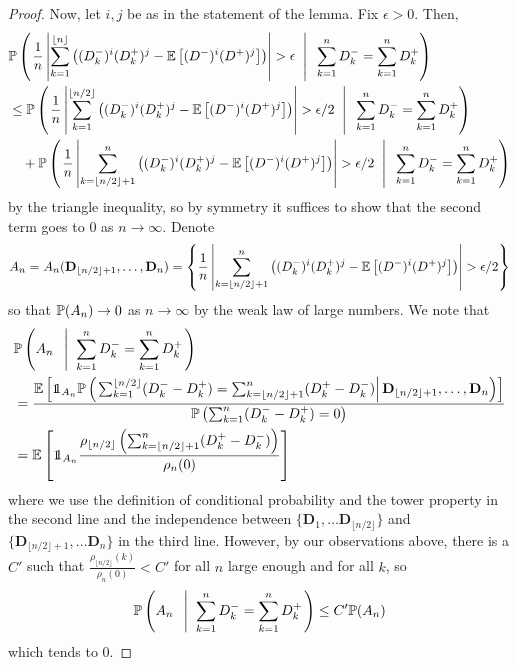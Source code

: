 \begin{proof}
Now, let $i,j$ be as in the statement of the lemma. Fix $\epsilon>0$.  Then,
\begin{align*} 
&\P\left(\left. \frac{1}{n}\left|\sum_{k=1}^{\lfloor n \rfloor}\left((D_k^-)^i(D_k^+)^j- \E\left[ (D^-)^i(D^+)^j \right]\right)\right|>\epsilon\;\; \right|\;\; \sum_{k=1}^n D_k^-=\sum_{k=1}^n D_k^+ \right)\\
&\leq \P\left(\left. \frac{1}{n}\left|\sum_{k=1}^{\lfloor n/2\rfloor}\left((D_k^-)^i(D_k^+)^j- \E\left[ (D^-)^i(D^+)^j \right]\right)\right|>\epsilon/2\;\; \right|\;\; \sum_{k=1}^n D_k^-=\sum_{k=1}^n D_k^+ \right)\\
&\quad +  \P\left(\left. \frac{1}{n}\left|\sum_{k={\lfloor n/2\rfloor}+1}^{n}\left((D_k^-)^i(D_k^+)^j- \E\left[ (D^-)^i(D^+)^j \right]\right)\right|>\epsilon/2\;\; \right|\;\; \sum_{k=1}^n D_k^-=\sum_{k=1}^n D_k^+ \right)
\end{align*}
by the triangle inequality, so by symmetry it suffices to show that the second term goes to $0$ as $n\to \infty$. Denote $$A_n=A_n(\mathbf{D}_{\lfloor n/2\rfloor +1 },\dots,\mathbf{D}_n)=\left\{\frac{1}{n}\left|\sum_{k={\lfloor n/2\rfloor}+1}^{n}\left((D_k^-)^i(D_k^+)^j- \E\left[ (D^-)^i(D^+)^j \right]\right)\right|>\epsilon/2\right\}$$
so that $\P(A_n)\to 0$ as $n\to\infty$ by the weak law of large numbers.
We note that 
\begin{align*}
    &\P\left(A_n\;\; \left|\;\; \sum_{k=1}^n D_k^-=\sum_{k=1}^n D_k^+ \right. \right)\\
    &=\frac{ \E\left[ \one_{A_n} \P\left(\left.\sum_{k=1}^{\lfloor n/2 \rfloor} (D_k^--D_k^+)=\sum_{k=\lfloor n/2\rfloor+1}^{n}(D_k^+-D_k^-) \right| \mathbf{D}_{\lfloor n/2\rfloor +1 },\dots,\mathbf{D}_n  \right)\right]}{
  \P\left(\sum_{k=1}^n (D_k^--D_k^+)=0\right)}\\
    &= \E\left[ \one_{A_n} \frac{\rho_{\lfloor n/2\rfloor}\left(\sum_{k=\lfloor n/2\rfloor+1}^{n}(D_k^+-D_k^-)\right)}{\rho_n(0)}\right]
\end{align*}
where we use the definition of conditional probability and the tower property in the second line and the independence between $\{\mathbf{D}_1,\dots\mathbf{D}_{\lfloor n/2 \rfloor}\}$ and $\{\mathbf{D}_{\lfloor n/2  \rfloor+1},\dots\mathbf{D}_n\}$ in the third line. However, by our observations above, there is a $C'$ such that $\frac{\rho_{\lfloor n/2\rfloor}(k)}{\rho_n(0)}<C'$ for all $n$ large enough and for all $k$, so
$$\P\left(A_n\;\; \left|\;\; \sum_{k=1}^n D_k^-=\sum_{k=1}^n D_k^+ \right. \right)\leq C'\P(A_n)$$
which tends to $0$.
\end{proof}
